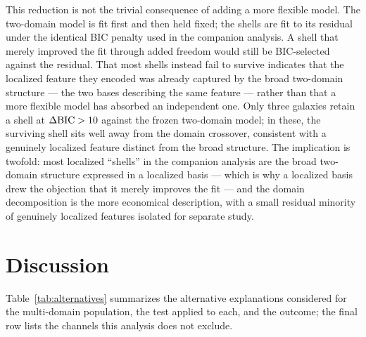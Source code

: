 \documentclass[twocolumn]{aastex701}
\newcommand{\dbic}{\Delta{\rm BIC}}
\begin{document}
This reduction is not the trivial consequence of adding a more flexible model. The
two-domain model is fit first and then held fixed; the shells are fit to its
residual under the identical BIC penalty used in the companion analysis. A shell that
merely improved the fit through added freedom would still be BIC-selected against the
residual. That most shells instead fail to survive indicates that the localized
feature they encoded was already captured by the broad two-domain structure --- the
two bases describing the same feature --- rather than that a more flexible model has
absorbed an independent one. Only three galaxies retain a shell at $\dbic > 10$ against the frozen
two-domain model; in these, the surviving shell sits well away from the domain
crossover, consistent with a genuinely localized feature distinct from the broad
structure. The implication is twofold: most localized ``shells'' in the companion
analysis are the broad two-domain structure expressed in a localized basis ---
which is why a localized basis drew the objection that it merely improves the
fit --- and the domain decomposition is the more economical description, with a
small residual minority of genuinely localized features isolated for separate
study.

\section{Discussion} \label{sec:discussion}

Table~\ref{tab:alternatives} summarizes the alternative explanations
considered for the multi-domain population, the test applied to each, and
the outcome; the final row lists the channels this analysis does not
exclude.
\end{document}
